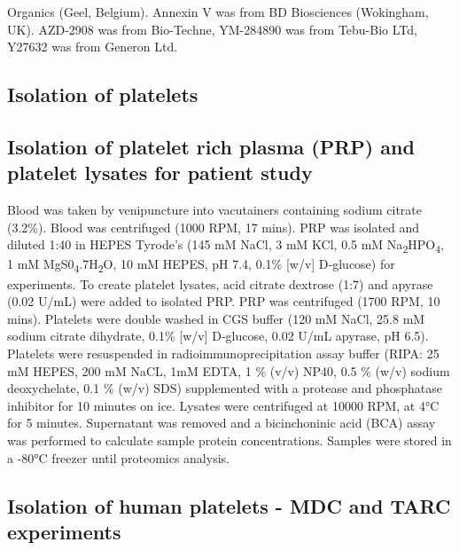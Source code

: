 \documentclass[11pt,twoside]{bristolthesis}
\begin{document}
Organics (Geel, Belgium). Annexin V was from BD Biosciences (Wokingham, UK). AZD-2908 was from Bio-Techne, YM-284890 was from Tebu-Bio LTd, Y27632 was from Generon Ltd.

\hypertarget{isolation-of-platelets}{%
\subsection{Isolation of platelets}\label{isolation-of-platelets}}

\hypertarget{isolation-of-platelet-rich-plasma-prp-and-platelet-lysates-for-patient-study}{%
\subsection{Isolation of platelet rich plasma (PRP) and platelet lysates for patient study}\label{isolation-of-platelet-rich-plasma-prp-and-platelet-lysates-for-patient-study}}

Blood was taken by venipuncture into vacutainers containing sodium citrate (3.2\%). Blood was centrifuged (1000 RPM, 17 mins). PRP was isolated and diluted 1:40 in HEPES Tyrode's (145 mM NaCl, 3 mM KCl, 0.5 mM Na\textsubscript{2}HPO\textsubscript{4}, 1 mM MgS0\textsubscript{4}.7H\textsubscript{2}O, 10 mM HEPES, pH 7.4, 0.1\% {[}w/v{]} D‐glucose) for experiments. To create platelet lysates, acid citrate dextrose (1:7) and apyrase (0.02 U/mL) were added to isolated PRP. PRP was centrifuged (1700 RPM, 10 mins). Platelets were double washed in CGS buffer (120 mM NaCl, 25.8 mM sodium citrate dihydrate, 0.1\% {[}w/v{]} D‐glucose, 0.02 U/mL apyrase, pH 6.5). Platelets were resuspended in radioimmunoprecipitation assay buffer (RIPA: 25 mM HEPES, 200 mM NaCL, 1mM EDTA, 1 \% (v/v) NP40, 0.5 \% (w/v) sodium deoxychelate, 0.1 \% (w/v) SDS) supplemented with a protease and phosphatase inhibitor for 10 minutes on ice. Lysates were centrifuged at 10000 RPM, at 4°C for 5 minutes. Supernatant was removed and a bicinchoninic acid (BCA) assay was performed to calculate sample protein concentrations. Samples were stored in a -80°C freezer until proteomics analysis.

\hypertarget{isolation-of-human-platelets---mdc-and-tarc-experiments}{%
\subsection{Isolation of human platelets - MDC and TARC experiments}\label{isolation-of-human-platelets---mdc-and-tarc-experiments}}
\end{document}

